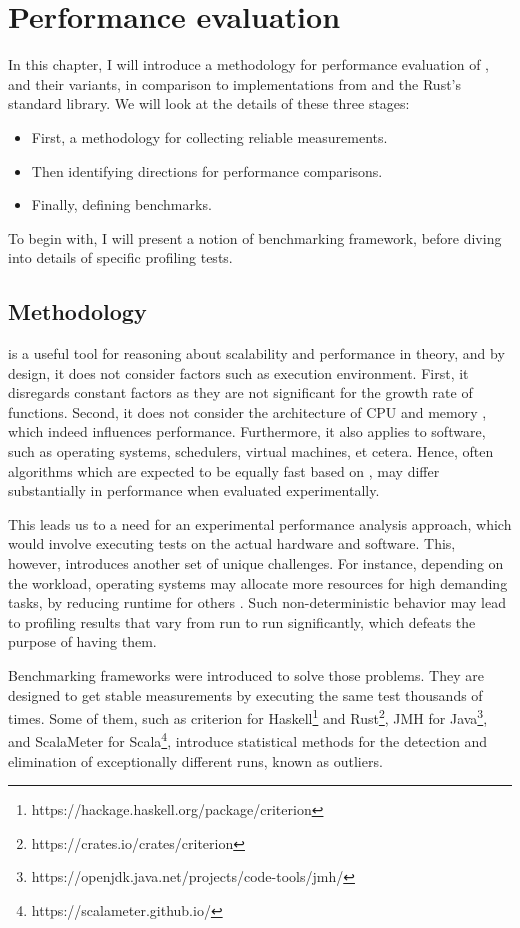 \chapter{Performance evaluation}
In this chapter, I will introduce a methodology for performance evaluation of \rrbvec{}, \pvec{} and their variants, in comparison to implementations from \imrsvec{} and the Rust's standard library. We will look at the details of these three stages:

\begin{itemize}
    \item First, a methodology for collecting reliable measurements. 
    \item Then identifying directions for performance comparisons. 
    \item Finally, defining benchmarks. 
\end{itemize}

To begin with, I will present a notion of benchmarking framework, before diving into details of specific profiling tests. 

\section{Methodology}
\bigochar{} is a useful tool for reasoning about scalability and performance in theory, and by design, it does not consider factors such as execution environment. First, it disregards constant factors as they are not significant for the growth rate of functions. Second, it does not consider the architecture of CPU and memory \cite{what-programmer-should-know-about-memory}, which indeed influences performance. Furthermore, it also applies to software, such as operating systems, schedulers, virtual machines, et cetera. Hence, often algorithms which are expected to be equally fast based on \bigochar{}, may differ substantially in performance when evaluated experimentally. 

This leads us to a need for an experimental performance analysis approach, which would involve executing tests on the actual hardware and software. This, however, introduces another set of unique challenges. For instance, depending on the workload, operating systems may allocate more resources for high demanding tasks, by reducing runtime for others \cite{statistically-rigorous-java-performance-evaluation}. Such non-deterministic behavior may lead to profiling results that vary from run to run significantly, which defeats the purpose of having them. 

Benchmarking frameworks were introduced to solve those problems. They are designed to get stable measurements by executing the same test thousands of times. Some of them, such as criterion for Haskell\footnote{https://hackage.haskell.org/package/criterion} and Rust\footnote{https://crates.io/crates/criterion}, JMH for Java\footnote{https://openjdk.java.net/projects/code-tools/jmh/}, and ScalaMeter for Scala\footnote{https://scalameter.github.io/}, introduce statistical methods for the detection and elimination of exceptionally different runs, known as outliers. 

